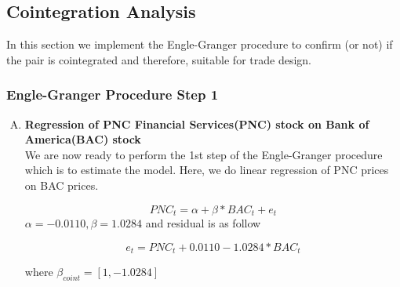 \documentclass[a4paper, 11pt]{article}
\begin{document}
\pagebreak
\subsection{Cointegration Analysis}

In this section we implement the Engle-Granger procedure to confirm (or not) if the pair is cointegrated and therefore, suitable for trade design.

\subsubsection{Engle-Granger Procedure Step 1}

\begin{enumerate}[A.]
\item
\textbf{Regression of PNC Financial Services(PNC) stock on Bank of America(BAC) stock }\\

We are now ready to perform the 1st step of the Engle-Granger procedure which is to estimate the model. Here, we do linear regression of PNC prices on BAC prices.

$$ PNC_t = \alpha + \beta * BAC_t + e_t $$
$\alpha = -0.0110, \beta = 1.0284 $ and residual is as follow 

$$ e_t = PNC_t + 0.0110 - 1.0284 * BAC_t $$

where $ \beta_{coint} = [1,-1.0284] $


\end{enumerate}
\end{document}
